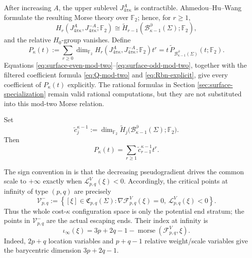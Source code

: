 \documentclass[11pt,a4paper]{article}
\numberwithin{equation}{section}
\theoremstyle{definition}
\theoremstyle{remark}
\newcommand{\Si}{\Sigma}
\newcommand{\pa}{\partial}
\newcommand{\wt}{\widetilde}
\newcommand{\BB}{\mathcal B}
\begin{document}
After increasing \(A\), the upper sublevel \(J_{4\pi\kappa}^{A}\) is
contractible. Ahmedou--Hu--Wang formulate the resulting Morse theory over
\(\mathbb F_2\); hence, for \(r\ge1\),
\begin{equation}\label{eq:MF-relative-pair}
H_r(J_{4\pi\kappa}^{A},J_{4\pi\kappa}^{-A};\mathbb F_2)
\cong
\wt H_{r-1}(\BB_{\kappa-1}^{\pa}(\Si);\mathbb F_2),
\end{equation}
and the relative \(H_0\)-group vanishes. Define
\begin{equation}\label{eq:MF-pair-polynomial}
P_\kappa(t):=
\sum_{r\ge0}\dim_{\mathbb F_2}
H_r(J_{4\pi\kappa}^{A},J_{4\pi\kappa}^{-A};\mathbb F_2)t^r
=t\,\wt P_{\BB_{\kappa-1}^{\pa}(\Si)}(t;\mathbb F_2).
\end{equation}
Equations \eqref{eq:surface-even-mod-two}--\eqref{eq:surface-odd-mod-two},
together with the filtered coefficient formula \eqref{eq:Q-mod-two} and
\eqref{eq:Rbn-explicit}, give every coefficient of \(P_\kappa(t)\)
explicitly. The rational formulas in Section
\ref{sec:surface-specialization} remain valid rational computations, but
they are not substituted into this mod-two Morse relation.

Set
\[
\widetilde c_j^{\kappa-1}:=
\dim_{\mathbb F_2}\widetilde H_j
\bigl(\BB_{\kappa-1}^{\pa}(\Si);\mathbb F_2\bigr).
\]
Then
\begin{equation}\label{eq:MF-pair-coefficients}
P_\kappa(t)=\sum_{r\ge1}\widetilde c_{r-1}^{\kappa-1}t^r.
\end{equation}

The sign convention in \cite{AHW2026} is that the decreasing pseudogradient
drives the common scale to \(+\infty\) exactly when
\(\mathcal L_{p,q}^V(\xi)<0\). Accordingly, the critical points at infinity
of type \((p,q)\) are precisely
\begin{equation}\label{eq:Vminus-pq-def}
\mathcal V_{p,q}^-:=
\left\{[\xi]\in\mathfrak C_{p,q}(\Si):
\nabla\mathcal F_{p,q}^V(\xi)=0,\ \mathcal L_{p,q}^V(\xi)<0\right\}.
\end{equation}
Thus the whole cost-\(\kappa\) configuration space is only the potential end
stratum; the points in \(\mathcal V_{p,q}^-\) are the actual escaping ends.
Their index at infinity is
\begin{equation}\label{eq:MF-index-at-infinity}
\iota_\infty(\xi)=
3p+2q-1-\operatorname{morse}(\mathcal F_{p,q}^V,\xi).
\end{equation}
Indeed, \(2p+q\) location variables and \(p+q-1\) relative weight/scale
variables give the barycentric dimension \(3p+2q-1\).
\end{document}
